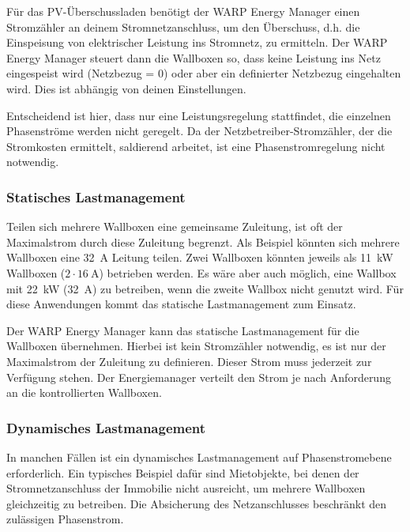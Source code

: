 \documentclass[a4paper,10pt]{article}
\begin{document}
\begin{multicols*}{2}
	Für das PV-Überschussladen benötigt der WARP Energy Manager einen Stromzähler
	an deinem Stromnetzanschluss, um den Überschuss, d.h. die Einspeisung von
	elektrischer Leistung ins Stromnetz, zu ermitteln. Der WARP Energy Manager
	steuert dann die Wallboxen so, dass keine Leistung ins Netz eingespeist wird
	(Netzbezug = 0) oder aber ein definierter Netzbezug eingehalten wird. Dies
	ist abhängig von deinen Einstellungen.

	Entscheidend ist hier, dass nur eine Leistungsregelung stattfindet, die einzelnen Phasenströme werden nicht geregelt. Da der Netzbetreiber-Stromzähler,
	der die Stromkosten ermittelt, saldierend arbeitet, ist eine
	Phasenstromregelung nicht notwendig.

	\vspace{-0.05cm}
	\subsubsection{Statisches Lastmanagement}
	\label{statisches_lastmanagement}

	Teilen sich mehrere Wallboxen eine gemeinsame Zuleitung, ist oft der
	Maximalstrom durch diese Zuleitung begrenzt. Als Beispiel könnten sich mehrere
	Wallboxen eine \SI{32}{\ampere} Leitung teilen. Zwei Wallboxen könnten jeweils als \SI{11}{\kilo\watt}
	Wallboxen ($2\cdot\SI{16}{\ampere}$) betrieben werden. Es wäre aber auch möglich, eine
	Wallbox mit \SI{22}{\kilo\watt} (\SI{32}{\ampere}) zu betreiben, wenn die zweite Wallbox nicht genutzt
	wird. Für diese Anwendungen kommt das statische Lastmanagement zum Einsatz.

	Der WARP Energy Manager kann das statische Lastmanagement für die Wallboxen
	übernehmen. Hierbei ist kein Stromzähler notwendig, es ist nur der
	Maximalstrom der Zuleitung zu definieren. Dieser Strom muss jederzeit zur
	Verfügung stehen. Der Energiemanager verteilt den Strom
	je nach Anforderung an die kontrollierten Wallboxen.

	\vspace{-0.05cm}
	\subsubsection{Dynamisches Lastmanagement}
	\label{dynamisches_lastmanagement}

	In manchen Fällen ist ein dynamisches Lastmanagement auf Phasenstromebene erforderlich.
	Ein typisches Beispiel dafür sind Mietobjekte, bei denen der Stromnetzanschluss der
	Immobilie nicht ausreicht, um mehrere Wallboxen gleichzeitig zu betreiben.
	Die Absicherung des Netzanschlusses beschränkt den zulässigen Phasenstrom.


\end{multicols*}
\end{document}
